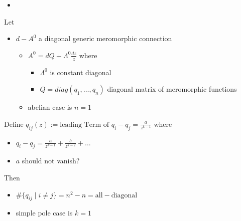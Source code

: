 \begin{frame}
  \insertsection{}
  \begin{itemize}
    \item \cite{boalch}
  \end{itemize}
\end{frame}
\begin{frame}
Let
\begin{itemize}
  \item $d-A^0$ a diagonal generic meromorphic connection
    \begin{itemize}
      \item $A^0=dQ+\Lambda^0\frac{dz}{z}$ where
        \begin{itemize}
          \item $\Lambda^0$ is constant diagonal
          \item $Q=diag(q_1,\dots,q_n)$ diagonal matrix of meromorphic functions
        \end{itemize}
      \item abelian case is $n=1$
    \end{itemize}
  \end{itemize}
  Define $q_{ij}(z):=\text{leading Term of }q_i-q_j = \frac{a}{z^{k-1}}$ where
  \begin{itemize}
    \item $q_i-q_j = \frac{a}{z^{k-1}} + \frac{b}{z^{k-2}}+\dots$
    \item $a$ should not vanish?
  \end{itemize}
  Then
  \begin{itemize}
    \item $\#\{q_{ij}\mid i \neq j\}=n^2-n=\text{all}-\text{diagonal}$
    \item simple pole case is $k=1$
  \end{itemize}
\end{frame}

